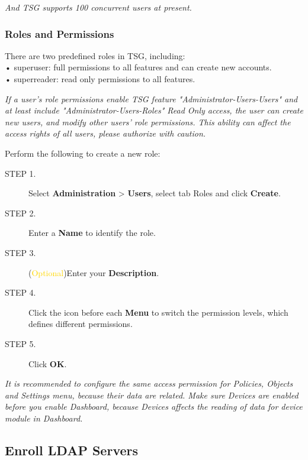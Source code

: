 \notemark\textit{And TSG supports 100 concurrent users at present.}

\subsubsection*{\hypertarget{link:Roles and Permissions}{Roles and Permissions}}
\label{sec:intro:admin:users:permission}

There are two predefined roles in TSG, including:\\
• superuser: full permissions to all features and can create new accounts.\\
• superreader: read only permissions to all features. 


\notemark\textit{If a user’s role permissions enable TSG feature "Administrator-Users-Users" and at least include "Administrator-Users-Roles" Read Only access, 
the user can create new users, and modify other users’ role permissions. This ability can affect the access rights of all users, please authorize with caution.}


Perform the following to create a new role:


\begin{description}
    \item[STEP 1.] Select \textbf{Administration} > \textbf{Users}, select tab Roles and click \textbf{Create}.
    \item[STEP 2.] Enter a \textbf{Name} to identify the role.
    \item[STEP 3.] (\textcolor{gold}{Optional})Enter your \textbf{Description}.
    \item[STEP 4.]	Click the icon before each \textbf{Menu} to switch the permission levels, which defines different permissions.
    \item[STEP 5.]	Click \textbf{OK}.
\end{description}


\notemark\textit{It is recommended to configure the same access permission for Policies, Objects and Settings menu, because their data are related. 
Make sure Devices are enabled before you enable Dashboard, because Devices affects the reading of data for device module in Dashboard.}


\subsection*{\hypertarget{link:Enroll LDAP Servers}{Enroll LDAP Servers}}
\label{sec:intro:admin:ldap}

